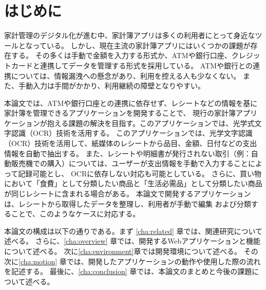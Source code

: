 \documentclass[main]{subfiles}
\begin{document}
\chapter{はじめに}
\label{cha:intro}

家計管理のデジタル化が進む中、家計簿アプリは多くの利用者にとって身近なツールとなっている。
しかし、現在主流の家計簿アプリにはいくつかの課題が存在する。
その多くは手動で金額を入力する形式か、ATMや銀行口座、クレジットカードと連携してデータを管理する形式を採用している。
ATMや銀行との連携については、情報漏洩への懸念があり、利用を控える人も少なくない。
また、手動入力は手間がかかり、利用継続の障壁となりやすい。

本論文では、ATMや銀行口座との連携に依存せず、レシートなどの情報を基に家計簿を管理できるアプリケーションを開発することで、
現行の家計簿アプリケーションが抱える課題の解決を目指す。このアプリケーションでは、光学式文字認識（OCR）技術を活用する。
このアプリケーションでは、光学文字認識（OCR）技術を活用して、紙媒体のレシートから品目、金額、日付などの支出情報を自動で抽出する。
また、レシートや明細書が発行されない取引（例：自動販売機での購入）については、ユーザーが支出情報を手動で入力することによって記録可能とし、
OCRに依存しない対応も可能としている。
さらに、買い物において「食費」として分類したい商品と「生活必需品」として分類したい商品が同じレシートに含まれる場合がある。
本論文で開発するアプリケーションは、レシートから取得したデータを整理し、利用者が手動で編集
および分類することで、このようなケースに対応する。

本論文の構成は以下の通りである。まず \ref{cha:related} 章では、関連研究について述べる。
さらに、\ref{cha:overview} 章では、開発するWebアプリケーションと機能について述べる。
次に\ref{cha:environment}章では開発環境について述べる。
その次に\ref{cha:motion} 章では、開発したアプリケーションの動作や使用した際の流れを記述する。
最後に、\ref{cha:conclusion} 章では、本論文のまとめと今後の課題について述べる。
\end{document}
